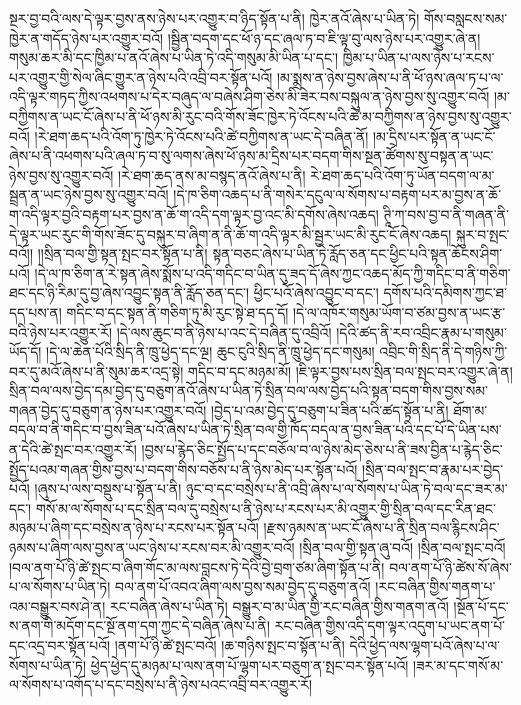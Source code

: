 སྔར་བྱ་བའི་ལས་དེ་ལྟར་བྱས་ནས་ཉེས་པར་འགྱུར་བ་ཉིད་སྟོན་པ་ནི། ཁྱེར་ནའོ་ཞེས་པ་ཡིན་ཏེ། གོས་བསླངས་སམ་ཁྱེར་ན་གདོད་ཉེས་པར་འགྱུར་བའོ། །སྦྱིན་བདག་དང་ཕོ་ཉ་དང་ཞལ་ཏ་བ་ཇི་ལྟ་བུ་ལས་ཉེས་པར་འགྱུར་ཞེ་ན། གསུམ་ཆར་མི་དང་ཁྱིམ་པ་ནའོ་ཞེས་པ་ཡིན་ཏེ་འདི་གསུམ་མི་ཡིན་པ་དང་། ཁྱིམ་པ་ཡིན་པ་ལས་ཉེས་པ་རངས་པར་འགྱུར་གྱི་སེལ་ཞིང་གྱུར་ན་ཉེས་པའི་འབྲི་བར་སྟོན་པའོ། །མ་སྨྲས་ན་ཉེས་བྱས་ཞེས་པ་ནི་ཕོ་ཉས་ཞལ་ཏ་པ་ལ་འདི་ལྟར་གཏད་ཀྱིས་འཕགས་པ་དེར་བཞུད་ལ་བཞེས་ཤིག་ཅེས་མི་ཟེར་བས་བསྐུལ་ན་ཉེས་བྱས་སུ་འགྱུར་བའོ། །མ་བཀྱིགས་ན་ཡང་ངོ་ཞེས་པ་ནི་ཕོ་ཉས་མི་རུང་བའི་གོས་ཟོང་ཁྱེར་ཏེ་འོངས་པའི་ཚེ་མ་བཀྱིགས་ན་ཉེས་བྱས་སུ་འགྱུར་བའོ། །རེ་ཐག་ཆད་པའི་འོག་ཏུ་ཁྱེར་ཏེ་འོངས་པའི་ཚེ་བཀྱིགས་ན་ཡང་དེ་བཞིན་ནོ། །མ་དྲིས་པར་སྟོན་ན་ཡང་ངོ་ཞེས་པ་ནི་འཕགས་པའི་ཞལ་ཏ་བ་སུ་ལགས་ཞེས་ཕོ་ཉས་མ་དྲིས་པར་བདག་གིས་སྔན་ཚོགས་སུ་བསྟན་ན་ཡང་ཉེས་བྱས་སུ་འགྱུར་བའོ། །རེ་ཐག་ཆད་ནས་མ་བསྙད་ནའོ་ཞེས་པ་ནི། རེ་ཐག་ཆད་པའི་འོག་ཏུ་ཡོན་བདག་ལ་མ་སྦྲན་ན་ཡང་ཉེས་བྱས་སུ་འགྱུར་བའོ། །དེ་ཁ་ཅིག་འཆད་པ་ནི་གསེར་དངུལ་ལ་སོགས་པ་བརྟག་པར་མ་བྱས་ན་ཆོ་ག་འདི་ལྟར་བྱའི་བརྟག་པར་བྱས་ན་ཆོ་ག་འདི་དག་ལྟར་བྱ་འང་མི་དགོས་ཞེས་འཆད། ཊཱི་ཀ་བས་བྱ་བ་ནི་གཞན་ནི་དེ་ལྟར་ཡང་རུང་གི་གོས་ཟོང་དུ་བསྐུར་བ་ཞིག་ན་ནི་ཆོ་ག་འདི་ལྟར་མི་སྦྱར་ཡང་མི་རུང་ངོ་ཞེས་འཆད། སྐུར་བ་སྤང་བའོ།། །།སྲིན་བལ་གྱི་སྟན་སྤང་བར་སྟོན་པ་ནི། སྟན་བཅང་ཞེས་པ་ཡིན་ཏེ་རློད་ཅན་དང་ཕྱིང་པའི་སྟན་ཆོངས་ཤིག་པའོ། །དེ་ལ་ཁ་ཅིག་ན་རེ་སྟན་ཞེས་སྨོས་པ་འདི་གདིང་བ་ཡིན་དུ་ཟད་དོ་ཞེས་ཀྱང་འཆད་མོད་ཀྱི་གདིང་བ་ནི་གཅིག་ཐང་དང་ཉི་རིམ་དུ་བྱ་ཞེས་འབྱུང་སྟན་ནི་རློད་ཅན་དང་། ཕྱིང་པའོ་ཞེས་འབྱུང་བ་དང་། དགོས་པའི་དམིགས་ཀྱང་ཐ་དད་པས་ན། གདིང་བ་དང་སྟན་ནི་གཅིག་ཏུ་མི་རུང་སྟེ་ཐ་དད་དོ། །དེ་ལ་འཁོར་གསུམ་ཡོག་བ་ཙམ་བྱས་ན་ཡང་རྩ་བའི་ཉེས་པར་འགྱུར་རོ། །དེ་ལས་ཆུང་བ་ནི་ཉེས་པ་འང་དེ་བཞིན་དུ་འབྲིའོ། །དེའི་ཚད་ནི་རབ་འབྲིང་རྣམ་པ་གསུམ་ཡོད་དོ། །དེ་ལ་ཆེན་པོའི་སྲིད་ནི་ཁྲུ་ཕྱེད་དང་ལྔ། ཆུང་ངུའི་སྲིད་ནི་ཁྲུ་ཕྱེད་དང་གསུམ། འབྲིང་གི་སྲིད་ནི་དེ་གཉིས་ཀྱི་བར་དུ་མའོ་ཞེས་པ་ནི་སུམ་ཆར་འདྲ་སྟེ། གདིང་བ་དང་མཉམ་མོ། །ཇི་ལྟར་བྱས་པས་སྲིན་བལ་སྤང་བར་འགྱུར་ཞེ་ན། སྲིན་བལ་ལས་བྱེད་དམ་བྱེད་དུ་བཅུག་ནའོ་ཞེས་པ་ཡིན་ཏེ་སྲིན་བལ་ལས་བྱེད་པའི་སྟན་བདག་གིས་བྱས་སམ་གཞན་བྱེད་དུ་བཅུག་ན་ཉེས་པར་འགྱུར་བའོ། །བྱེད་པ་འམ་བྱེད་དུ་བཅུག་པ་ཟིན་པའི་ཚད་སྟོན་པ་ནི། ཐོག་མ་བདལ་བ་ནི་གདིང་བ་བྱས་ཟིན་པའོ་ཞེས་པ་ཡིན་ཏེ་སྲིན་བལ་གྱི་ཁོད་བདལ་ན་བྱས་ཟིན་པའི་དང་པོ་དེ་ཡིན་པས་ན་དེའི་ཚེ་སྤང་བར་འགྱུར་རོ། །བྱས་པ་རྙེད་ཅིང་སྤྱོད་པ་དང་བཅོལ་བ་ལ་ཉེས་མེད་ཅེས་པ་ནི་ཟས་བྱིན་པ་རྙེད་ཅིང་སྤྱོད་པའམ་གཞན་གྱིས་བྱས་པ་བདག་གིས་བཅོས་པ་ནི་ཉེས་མེད་པར་སྟོན་པའོ། །སྲིན་བལ་སྤང་བ་རྣམ་པར་བྱེད་པའོ། །ཞུས་པ་ལས་བསྡུས་པ་སྟོན་པ་ནི། ཉུང་བ་དང་བསྲེས་པ་ནི་འབྲི་ཞེས་པ་ལ་སོགས་པ་ཡིན་ཏེ་བལ་དང་ཟར་མ་དང་། གསོ་མ་ལ་སོགས་པ་དང་སྲིན་བལ་དུ་བསྲེས་པ་ནི་ཉེས་པ་རངས་པར་མི་འགྱུར་གྱི་སྲིན་བལ་དང་རིན་ཐང་མཉམ་པ་ཞིག་དང་བསྲེས་ན་ཉེས་པ་རངས་པར་སྟོན་པའོ། །རྫས་ཉམས་ན་ཡང་ངོ་ཞེས་པ་ནི་སྲིན་བལ་རྙིངས་ཤིང་ཉམས་པ་ཞིག་ལས་བྱས་ན་ཡང་ཉེས་པ་རངས་བར་མི་འགྱུར་བའོ། །སྲིན་བལ་གྱི་སྟན་ཞུ་བའོ། །སྲིན་བལ་སྤང་བའོ། །བལ་ནག་པོ་ཉི་ཚེ་སྤང་བ་ཞིག་གོང་མ་ལས་བླངས་ཏེ་དེའི་བྱེ་བྲག་ཙམ་ཞིག་སྟོན་པ་ནི། བལ་ནག་པོ་ཉི་ཚེས་སོ་ཞེས་པ་ལ་སོགས་པ་ཡིན་ཏེ། བལ་ནག་པོ་འབའ་ཞིག་ལས་བྱས་སམ་བྱེད་དུ་བཅུག་ནའོ། །རང་བཞིན་གྱིས་གནག་པ་འམ་བསྒྱུར་བས་ཤེ་ན། རང་བཞིན་ཞེས་པ་ཡིན་ཏེ། བསྒྱུར་བ་མ་ཡིན་གྱི་རང་བཞིན་གྱིས་གནག་ནའོ། །སྔོན་པོ་དང་ས་ནག་གི་མདོག་དང་སྔོ་ནག་དག་ཀྱང་དེ་བཞིན་ཞེས་པ་ནི། རང་བཞིན་གྱིས་འདི་དག་ལྟར་འདུག་པ་ཡང་ནག་པོ་དང་འདྲ་བར་སྟོན་པའོ། །ནག་པོ་ཉི་ཚེ་སྤང་བའོ། །ཆ་གཉིས་སྤང་བ་སྟོན་པ་ནི། དེའི་ཕྱེད་ལས་ལྷག་པའོ་ཞེས་པ་ལ་སོགས་པ་ཡིན་ཏེ། ཕྱེད་ཕྱེད་དུ་མཉམ་པ་ལས་ནག་པོ་ལྷག་པར་བཅུག་ན་སྤང་བར་སྟོན་པའོ། །ཟར་མ་དང་གསོ་མ་ལ་སོགས་པ་འགོད་པ་དང་བསྲེས་པ་ནི་ཉེས་པའང་འབྲི་བར་འགྱུར་རོ། 